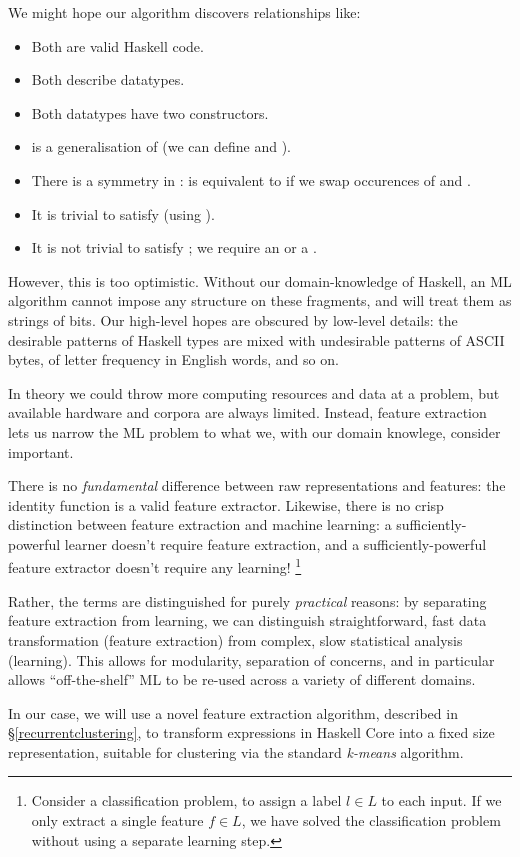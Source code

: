 We might hope our algorithm discovers relationships like:

\begin{itemize}
  \item Both are valid Haskell code.
  \item Both describe datatypes.
  \item Both datatypes have two constructors.
  \item {} is a generalisation of  (we can define  and ).
  \item There is a symmetry in :  is equivalent to  if we swap occurences of  and .
  \item It is trivial to satisfy  (using ).
  \item It is not trivial to satisfy ; we require an  or a .
\end{itemize}

However, this is too optimistic. Without our domain-knowledge of Haskell, an ML algorithm cannot impose any structure on these fragments, and will treat them as strings of bits. Our high-level hopes are obscured by low-level details: the desirable patterns of Haskell types are mixed with undesirable patterns of ASCII bytes, of letter frequency in English words, and so on.

In theory we could throw more computing resources and data at a problem, but available hardware and corpora are always limited. Instead, feature extraction lets us narrow the ML problem to what we, with our domain knowlege, consider important.

There is no \emph{fundamental} difference between raw representations and features: the identity function is a valid feature extractor. Likewise, there is no crisp distinction between feature extraction and machine learning: a sufficiently-powerful learner doesn't require feature extraction, and a sufficiently-powerful feature extractor doesn't require any learning! \footnote{Consider a classification problem, to assign a label $l \in L$ to each input. If we only extract a single feature $f \in L$, we have solved the classification problem without using a separate learning step.}

Rather, the terms are distinguished for purely \emph{practical} reasons: by separating feature extraction from learning, we can distinguish straightforward, fast data transformation (feature extraction) from complex, slow statistical analysis (learning). This allows for modularity, separation of concerns, and in particular allows ``off-the-shelf'' ML to be re-used across a variety of different domains.

In our case, we will use a novel feature extraction algorithm, described in \S \ref{recurrentclustering}, to transform expressions in Haskell Core into a fixed size representation, suitable for clustering via the standard \emph{k-means} algorithm.
